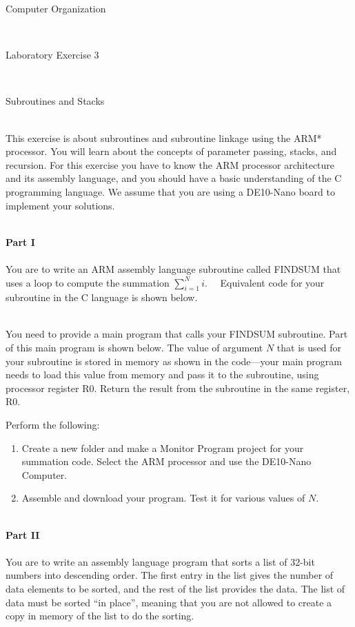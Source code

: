 \documentclass[epsfig,10pt,fullpage]{article}
\newcommand{\LabNum}{3}
\begin{document}
\centerline{\huge Computer Organization}
~\\
\centerline{\huge Laboratory Exercise \LabNum}
~\\
\centerline{\large Subroutines and Stacks}
~\\

\noindent
This exercise is about subroutines and subroutine linkage using the ARM* processor.  You will 
learn about the concepts of parameter passing, stacks, and recursion.  For this 
exercise you have to know the ARM processor architecture and its assembly language, and 
you should have a basic understanding of the C programming language. We assume that you
are using a DE10-Nano board to implement your solutions.

~\\
\noindent
{\bf Part I}
~\\
~\\
\noindent
You are to write an ARM assembly language subroutine called FINDSUM that uses a loop to 
compute the summation
$\displaystyle\sum_{i=1}^{N} i$.
~~Equivalent code for your subroutine in the C language is shown below. 


~\\
\noindent
You need to provide a main program that calls your FINDSUM subroutine.
Part of this main program is shown below.
The value of argument $N$ that is used for your subroutine is stored
in memory as shown in the code---your main program needs to load this value from memory and pass 
it to the subroutine, using processor register R0. Return the result from the subroutine
in the same register, R0.


\newpage
Perform the following:

\begin{enumerate}
\item
Create a new folder and make a Monitor Program project for your summation code. Select
the ARM processor and use the DE10-Nano Computer. 

\item
Assemble and download your program.  Test it for various values of $N$.
\end{enumerate}

~\\
\noindent
{\bf Part II}
~\\
~\\
\noindent
You are to write an assembly language program that sorts a list of 32-bit numbers 
into descending order.  The first entry in the list gives the number of data elements to 
be sorted, and the rest of the list provides the data. The list of data must be 
sorted ``in place'', meaning that you are not allowed to create a copy in memory of the 
list to do the sorting.  
\end{document}
